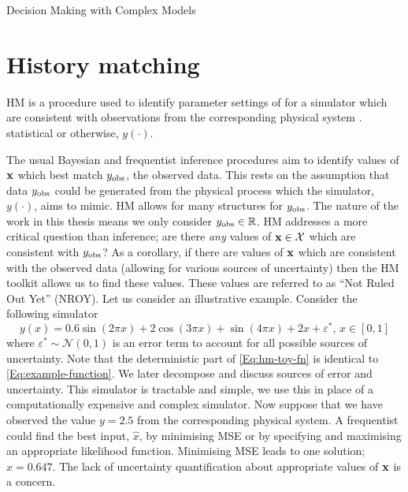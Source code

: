 \begin{chapter}{Decision Making with Complex Models \label{Chap:optimisation}}
\section{History matching}

HM is a procedure used to identify parameter settings of for a simulator which are consistent with observations from the corresponding physical system \citep{Craig1997, Domingo2020}.  statistical or otherwise, $y(\cdot)$.

The usual Bayesian and frequentist inference procedures aim to identify values of $\mathbf{x}$ which best match $y_{\text{obs}}$, the observed data. This rests on the assumption that data $y_{\text{obs}}$ could be generated from the physical process which the simulator, $y(\cdot)$, aims to mimic. HM allows for many structures for $y_{\text{obs}}$. The nature of the work in this thesis means we only consider $y_{\text{obs}} \in \mathbb{R}$. HM addresses a more critical question than inference; are there \textit{any} values of $\mathbf{x} \in \mathcal{X}$ which are consistent with $y_{\text{obs}}$? As a corollary, if there are values of $\mathbf{x}$ which are consistent with the observed data (allowing for various sources of uncertainty) then the HM toolkit allows us to find these values. These values are referred to as ``Not Ruled Out Yet'' (NROY). Let us consider an illustrative example. Consider the following simulator
\begin{equation}
 y(x) = 0.6 \sin (2 \pi x) + 2 \cos (3 \pi x) + \sin (4 \pi x) + 2x + \varepsilon^{*}, \, x \in [0,1] \label{Eq:hm-toy-fn}
\end{equation}
where $\varepsilon^{*} \sim \mathcal{N}(0,1)$ is an error term to account for all possible sources of uncertainty. Note that the deterministic part of \cref{Eq:hm-toy-fn} is identical to \cref{Eq:example-function}. We later decompose and discuss sources of error and uncertainty. This simulator is tractable and simple, we use this in place of a computationally expensive and complex simulator. Now suppose that we have observed the value $y = 2.5$ from the corresponding physical system. A frequentist could find the best input, $\hat{x}$, by minimising MSE or by specifying and maximising an appropriate likelihood function. Minimising MSE leads to one solution; $\hat{x} = 0.647$. The lack of uncertainty quantification about appropriate values of $\mathbf{x}$ is a concern.


\end{chapter}
